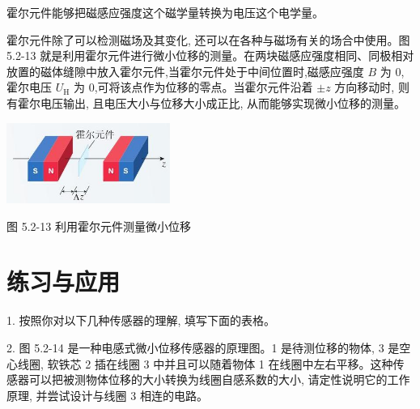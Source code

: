 \documentclass[10pt]{article}
\begin{document}
霍尔元件能够把磁感应强度这个磁学量转换为电压这个电学量。

霍尔元件除了可以检测磁场及其变化, 还可以在各种与磁场有关的场合中使用。图 5.2-13 就是利用霍尔元件进行微小位移的测量。在两块磁感应强度相同、同极相对放置的磁体缝隙中放入霍尔元件,当霍尔元件处于中间位置时,磁感应强度 \(B\) 为 0,霍尔电压 \({U}_{\mathrm{H}}\) 为 0,可将该点作为位移的零点。当霍尔元件沿着 \(\pm z\) 方向移动时, 则有霍尔电压输出, 且电压大小与位移大小成正比, 从而能够实现微小位移的测量。

\begin{center}
\includegraphics[max width=0.4\textwidth]{images/01910e72-c5b7-7ed5-a6d4-fb3a5faefc32_107_325407.jpg}
\end{center}

图 5.2-13 利用霍尔元件测量微小位移

\section*{练习与应用}

1. 按照你对以下几种传感器的理解, 填写下面的表格。

\begin{center}
\end{center}

2. 图 5.2-14 是一种电感式微小位移传感器的原理图。1 是待测位移的物体, 3 是空心线圈, 软铁芯 2 插在线圈 3 中并且可以随着物体 1 在线圈中左右平移。这种传感器可以把被测物体位移的大小转换为线圈自感系数的大小, 请定性说明它的工作原理, 并尝试设计与线圈 3 相连的电路。
\end{document}
